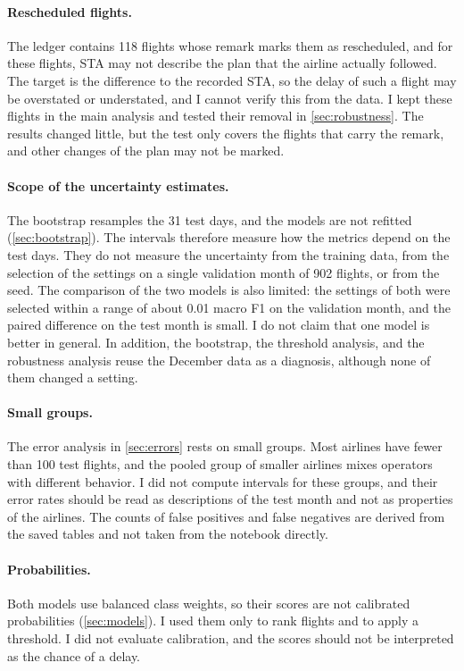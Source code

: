 \paragraph{Rescheduled flights.} The ledger contains 118 flights whose remark marks them as rescheduled, and for these flights, STA may not describe the plan that the airline actually followed. The target is the difference to the recorded STA, so the delay of such a flight may be overstated or understated, and I cannot verify this from the data. I kept these flights in the main analysis and tested their removal in \cref{sec:robustness}. The results changed little, but the test only covers the flights that carry the remark, and other changes of the plan may not be marked.

\paragraph{Scope of the uncertainty estimates.} The bootstrap resamples the 31 test days, and the models are not refitted (\cref{sec:bootstrap}). The intervals therefore measure how the metrics depend on the test days. They do not measure the uncertainty from the training data, from the selection of the settings on a single validation month of 902 flights, or from the seed. The comparison of the two models is also limited: the settings of both were selected within a range of about 0.01 macro F1 on the validation month, and the paired difference on the test month is small. I do not claim that one model is better in general. In addition, the bootstrap, the threshold analysis, and the robustness analysis reuse the December data as a diagnosis, although none of them changed a setting.

\paragraph{Small groups.} The error analysis in \cref{sec:errors} rests on small groups. Most airlines have fewer than 100 test flights, and the pooled group of smaller airlines mixes operators with different behavior. I did not compute intervals for these groups, and their error rates should be read as descriptions of the test month and not as properties of the airlines. The counts of false positives and false negatives are derived from the saved tables and not taken from the notebook directly.

\paragraph{Probabilities.} Both models use balanced class weights, so their scores are not calibrated probabilities (\cref{sec:models}). I used them only to rank flights and to apply a threshold. I did not evaluate calibration, and the scores should not be interpreted as the chance of a delay.

